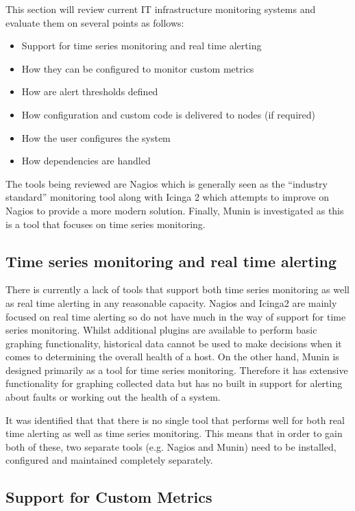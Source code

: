 \documentclass[bsc,deptreport,twoside,parskip,singlespacing,notimes]{infthesis}
\begin{document}
This section will review current IT infrastructure monitoring systems and
evaluate them on several points as follows:
\begin{itemize}
	\item Support for time series monitoring and real time alerting
	\item How they can be configured to monitor custom metrics
	\item How are alert thresholds defined
	\item How configuration and custom code is delivered to nodes (if required)
	\item How the user configures the system
	\item How dependencies are handled
\end{itemize}
The tools being reviewed are Nagios which is generally seen as the ``industry
standard'' monitoring tool along with Icinga 2 which attempts to improve on
Nagios to provide a more modern solution. Finally, Munin is investigated as this
is a tool that focuses on time series monitoring.


\subsection{Time series monitoring and real time alerting}

	There is currently a lack of tools that support both
	time series monitoring as well as real time alerting in any reasonable capacity.
	Nagios and Icinga2 are mainly focused on real time alerting so do not have much
	in the way of support for time series monitoring.  Whilst additional plugins are
	available to perform basic graphing functionality, historical data
	cannot be used to make decisions when it comes to determining the overall
	health of a host. On the other hand, Munin is designed primarily as a tool for time
	series monitoring.  Therefore it has extensive functionality for graphing
	collected data but has no built in support for alerting about faults or working
	out the health of a system.


	It was identified that that there is no single tool that performs well for
	both real time alerting as well as time series monitoring.  This means that
	in order to gain both of these, two separate tools (e.g. Nagios and Munin)
	need to be installed, configured and maintained completely separately.

\subsection{Support for Custom Metrics}
\end{document}
